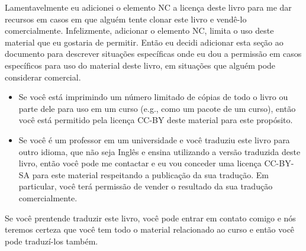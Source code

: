 Lamentavelmente eu adicionei o elemento NC a licença deste livro para me dar 
recursos em casos em que alguém tente clonar este livro e vendê-lo 
comercialmente. Infelizmente, adicionar o elemento NC, limita o uso deste
material que eu gostaria de permitir. Então eu decidi adicionar esta seção
ao documento para descrever situações específicas onde eu dou a permissão em 
casos específicos para uso do material deste livro, em situações que alguém 
pode considerar comercial.

\begin{itemize}

\item Se você está imprimindo um número limitado de cópias de todo o livro ou 
parte dele para uso em um curso (e.g., como um pacote de um curso), então
você está permitido pela licença CC-BY deste material para este propósito.


\item Se você é um professor em um universidade e você traduziu este livro
para outro idioma, que não seja Inglês e ensina utilizando a versão 
traduzida deste livro, então você pode me contactar e eu vou conceder 
uma licença CC-BY-SA para este material respeitando a publicação da sua
tradução. Em particular, você terá permissão de vender o resultado da sua 
tradução comercialmente.
\end{itemize}


Se você prentende traduzir este livro, você pode entrar em contato comigo
e nós teremos certeza que você tem todo o material relacionado ao curso e
então você pode traduzí-los também.

